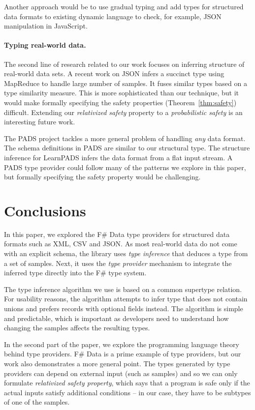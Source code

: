 \documentclass[10pt,preprint,blind,clearpagebib]{sigplanconf}
\begin{document}
Another approach would be to use gradual typing \cite{gradual,gradual-js} and add types for structured
data formats to existing dynamic language to check, for example, JSON manipulation in JavaScript.

\paragraph{Typing real-world data.}
The second line of research related to our work focuses on inferring structure of real-world data sets.
A recent work on JSON \cite{typing-json} infers a succinct type using MapReduce to handle large number
of samples. It fuses similar types based on a type similarity measure. This is more sophisticated than
our technique, but it would make formally specifying the safety properties (Theorem~\ref{thm:safety}) difficult.
Extending our \emph{relativized safety} property to a \emph{probabilistic safety} is an interesting 
future work.

The PADS project \cite{pads-dsl,pads-ml} tackles a more general problem of handling \emph{any} data format.
The schema definitions in PADS are similar to our structural type. The structure inference for LearnPADS
\cite{pads-learn} infers the data format from a flat input stream. A PADS type provider could follow
many of the patterns we explore in this paper, but formally specifying the safety property would be
challenging.

\section{Conclusions}
\label{sec:conclusions}

In this paper, we explored the F\# Data type providers for structured data formats such as XML, CSV and JSON.
As most real-world data do not come with an explicit schema, the library uses \emph{type inference} that
deduces a type from a set of samples. Next, it uses the \emph{type provider} mechanism to integrate the 
inferred type directly into the F\# type system.

The type inference algorithm we use is based on a common supertype relation. For usability reasons, the
algorithm attempts to infer type that does not contain unions and prefers records with optional fields instead.
The algorithm is simple and predictable, which is important as developers need to understand how changing the
samples affects the resulting types.

In the second part of the paper, we explore the programming language theory behind type providers. F\# Data
is a prime example of type providers, but our work also demonstrates a more general point. The types generated
by type providers can depend on external input (such as samples) and so we can only formulate \emph{relativized
safety property}, which says that a program is safe only if the actual inputs satisfy additional conditions --
in our case, they have to be subtypes of one of the samples.
\end{document}
